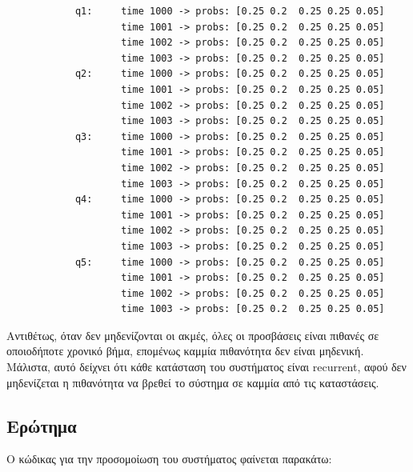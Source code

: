 \documentclass{article}
\newcommand{\eng}[1]{\foreignlanguage{english}{#1}} %
\begin{document}
    \begin{verbatim}
            q1:     time 1000 -> probs: [0.25 0.2  0.25 0.25 0.05]
                    time 1001 -> probs: [0.25 0.2  0.25 0.25 0.05]
                    time 1002 -> probs: [0.25 0.2  0.25 0.25 0.05]
                    time 1003 -> probs: [0.25 0.2  0.25 0.25 0.05]
            q2:     time 1000 -> probs: [0.25 0.2  0.25 0.25 0.05]
                    time 1001 -> probs: [0.25 0.2  0.25 0.25 0.05]
                    time 1002 -> probs: [0.25 0.2  0.25 0.25 0.05]
                    time 1003 -> probs: [0.25 0.2  0.25 0.25 0.05]
            q3:     time 1000 -> probs: [0.25 0.2  0.25 0.25 0.05]
                    time 1001 -> probs: [0.25 0.2  0.25 0.25 0.05]
                    time 1002 -> probs: [0.25 0.2  0.25 0.25 0.05]
                    time 1003 -> probs: [0.25 0.2  0.25 0.25 0.05]
            q4:     time 1000 -> probs: [0.25 0.2  0.25 0.25 0.05]
                    time 1001 -> probs: [0.25 0.2  0.25 0.25 0.05]
                    time 1002 -> probs: [0.25 0.2  0.25 0.25 0.05]
                    time 1003 -> probs: [0.25 0.2  0.25 0.25 0.05]
            q5:     time 1000 -> probs: [0.25 0.2  0.25 0.25 0.05]
                    time 1001 -> probs: [0.25 0.2  0.25 0.25 0.05]
                    time 1002 -> probs: [0.25 0.2  0.25 0.25 0.05]
                    time 1003 -> probs: [0.25 0.2  0.25 0.25 0.05]
    \end{verbatim}

Αντιθέτως, όταν δεν μηδενίζονται οι ακμές, όλες οι προσβάσεις είναι
πιθανές σε οποιοδήποτε χρονικό βήμα, επομένως καμμία πιθανότητα δεν
είναι μηδενική. Μάλιστα, αυτό δείχνει ότι κάθε κατάσταση του
συστήματος είναι \eng{recurrent}, αφού δεν μηδενίζεται η πιθανότητα
να βρεθεί το σύστημα σε καμμία από τις καταστάσεις.

\subsection{Ερώτημα}

Ο κώδικας για την προσομοίωση του συστήματος φαίνεται παρακάτω:
\end{document}
